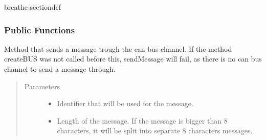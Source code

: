 \documentclass[a4paper,10pt,english]{sphinxmanual}
\begin{document}

\begin{fulllineitems}
\label{\detokenize{classesdetails:_CPPv49STCanScan}}%
\pysigstartmultiline
{}%
\pysigstopmultiline
\begin{sphinxuseclass}{breathe-sectiondef}\subsubsection*{Public Functions}

\begin{fulllineitems}
\label{\detokenize{classesdetails:_CPPv4N9STCanScan11sendMessageEshPhb}}%
\pysigstartmultiline
{}%
\pysigstopmultiline
\sphinxAtStartPar
Method that sends a message trough the can bus channel. If the method createBUS was not called before this, sendMessage will fail, as there is no can bus channel to send a message through.
\begin{quote}\begin{description}
\item[{Parameters}] \leavevmode\begin{itemize}
\item {} 
\sphinxAtStartPar
{} \textendash{} Identifier that will be used for the message. 

\item {} 
\sphinxAtStartPar
{} \textendash{} Length of the message. If the message is bigger than 8 characters, it will be split into separate 8 characters messages. 


\end{itemize}
\end{description}
\end{quote}
\end{fulllineitems}
\end{sphinxuseclass}
\end{fulllineitems}
\end{document}
